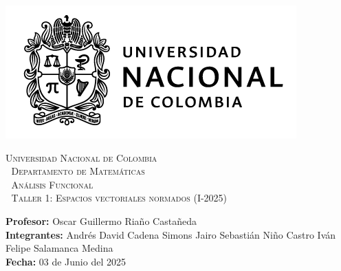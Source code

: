 \thispagestyle{empty}

\begin{minipage}{0.3\textwidth}
  \includegraphics[scale=0.35]{logounal.png}
\end{minipage}%
\hfill
\begin{minipage}{0.65\textwidth}
  \begin{center}
    \scshape
    \Large \textsc{Universidad Nacional de Colombia} \\
    \textcolor{white}{\tiny.} \Large \textsc{Departamento de Matemáticas} \\
    \textcolor{white}{\tiny.} \large \textsc{Análisis Funcional} \\
    \textcolor{white}{\tiny.} \large \textsf{Taller 1: Espacios vectoriales normados} \normalsize (I-2025)
  \end{center}
\end{minipage}

\vspace{0.3cm}
\normalfont

\textbf{Profesor:} Oscar Guillermo Riaño Castañeda\\
\textbf{Integrantes:} Andrés David Cadena Simons \hspace{2.8cm}  Jairo Sebastián Niño Castro\hspace{2.8cm}
Iván Felipe Salamanca Medina\\
\hspace*{2.1cm}\hspace{2.25cm}\textbf{Fecha:} 03 de Junio del 2025\\
\vspace{0.25cm}\\


